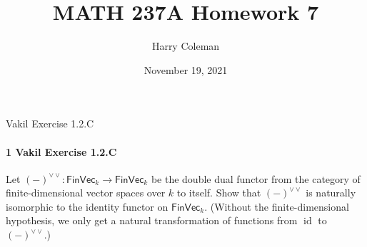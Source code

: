 \documentclass[12pt]{article}
\renewcommand{\maketitle}{\thispagestyle{title}}
\newlength{\myparskip}
\newenvironment{fullbox}{\begin{lrbox}{\savefullbox}\begin{minipage}{\dimexpr\textwidth-2\fboxsep\relax}\setlength{\parskip}{\myparskip}}{\end{minipage}\end{lrbox}\framebox[\textwidth]{\usebox{\savefullbox}}}
\newenvironment{pbox}[1][]{\begin{fullbox}\ifx#1\empty\else\paragraph{#1}\phantom{}\fi}{\end{fullbox}}
\theoremstyle{definition}
\newcommand{\<}{\langle}
\renewcommand{\>}{\rangle}
\DeclareMathOperator{\id}{id}
\newcommand{\FinVec}{\mathsf{FinVec}}
\newcommand{\vv}{{\vee\vee}}
\begin{document}
\title{MATH 237A Homework 7}
\author{Harry Coleman\makebox[0pt][r]{\raisebox{-0.25in}[0pt][0pt]{(worked with Joseph Sullivan)}}}
\date{November 19, 2021}
\maketitle

\begin{pbox}[1 Vakil Exercise 1.2.C]
    Let $(-)^\vv : \FinVec_k \to \FinVec_k$ be the double dual functor from the category of finite-dimensional vector spaces over $k$ to itself.
    Show that $(-)^\vv$ is naturally isomorphic to the identity functor on $\FinVec_k$. (Without the finite-dimensional hypothesis, we only get a natural transformation of functions from $\id$ to $(-)^\vv$.)
\end{pbox}
\end{document}
